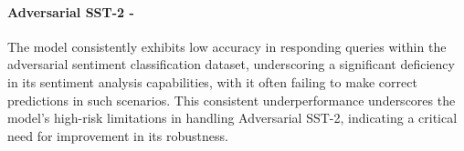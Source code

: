 \paragraph{Adversarial SST-2 - \high}
The model consistently exhibits low accuracy in responding queries within the adversarial sentiment classification dataset, underscoring a significant deficiency in its sentiment analysis capabilities, with it often failing to make correct predictions in such scenarios. This consistent underperformance underscores the model's high-risk limitations in handling Adversarial SST-2, indicating a critical need for improvement in its robustness.

